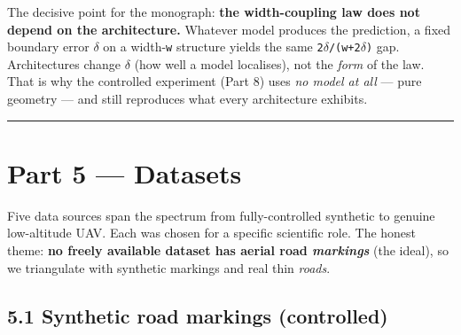 \documentclass[11pt]{article}
\begin{document}
The decisive point for the monograph: \textbf{the width-coupling law does not depend on the architecture.} Whatever model produces the prediction, a fixed boundary error \texttt{$\delta$} on a width-\texttt{w} structure yields the same \texttt{2$\delta$/(w+2$\delta$)} gap. Architectures change \texttt{$\delta$} (how well a model localises), not the \textit{form} of the law. That is why the controlled experiment (Part 8) uses \textit{no model at all} --- pure geometry --- and still reproduces what every architecture exhibits.

\vspace{3pt}\hrule\vspace{3pt}
\clearpage\section*{Part 5 --- Datasets}

Five data sources span the spectrum from fully-controlled synthetic to genuine low-altitude UAV. Each was chosen for a specific scientific role. The honest theme: \textbf{no freely available dataset has aerial road \textit{markings}} (the ideal), so we triangulate with synthetic markings and real thin \textit{roads}.

\subsection*{5.1 Synthetic road markings (controlled)}
\end{document}
